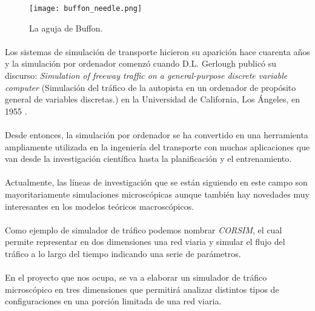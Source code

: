 	\begin{figure}[ht]
		\centering
			\texttt{[image: buffon\_needle.png]}
		\caption{La aguja de Buffon.}
		\label{fig:AgujaBuffon}
	\end{figure}
	
	\paragraph{}	
	Los sistemas de simulación de transporte hicieron su aparición hace cuarenta años y la simulación por ordenador comenzó cuando D.L. Gerlough publicó su discurso: \emph{Simulation of freeway traffic on a general-purpose discrete variable computer} (Simulación del tráfico de la autopista en un ordenador de propósito general de variables discretas.) en la Universidad de California, Los Ángeles, en 1955 \cite{Kallberg1971}.
	
	\paragraph{}
	Desde entonces, la simulación por ordenador se ha convertido en una herramienta ampliamente utilizada en la ingeniería del transporte con muchas aplicaciones que van desde la investigación científica hasta la planificación y el entrenamiento.
	
	
	\paragraph{}
	Actualmente, las líneas de investigación que se están siguiendo en este campo son mayoritariamente simulaciones microscópicas aunque también hay novedades muy interesantes en los modelos teóricos macroscópicos.
	
	
	\paragraph{}
	Como ejemplo de simulador de tráfico podemos nombrar \emph{CORSIM}, el cual permite representar en dos dimensiones una red viaria y simular el flujo del tráfico a lo largo del tiempo indicando una serie de parámetros.
	
	
	\paragraph{}
	En el proyecto que nos ocupa, se va a elaborar un simulador de tráfico microscópico en tres dimensiones que permitirá analizar distintos tipos de configuraciones en una porción limitada de una red viaria.

